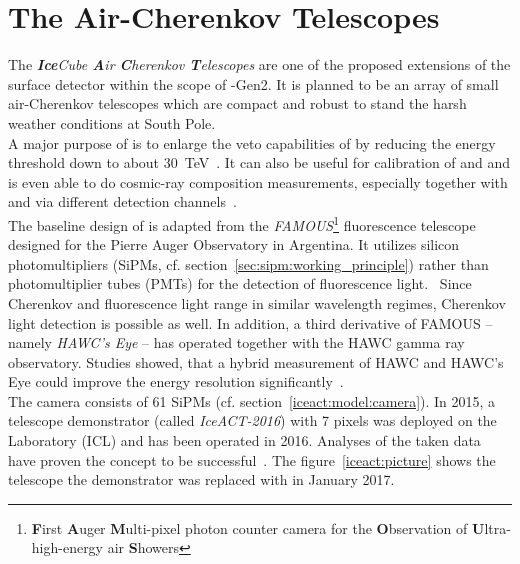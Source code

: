 \section{The \icecube Air-Cherenkov Telescopes \iceact}\label{sec:iceact_intro}

The \textit{\textbf{Ice}Cube \textbf{A}ir \textbf{C}herenkov \textbf{T}elescopes} \textit{\iceact} are one of the proposed extensions of the surface detector \icetop within the scope of \icecube-Gen2. It is planned to be an array of small air-Cherenkov telescopes which are compact and robust to stand the harsh weather conditions at South Pole.\\

A major purpose of \iceact is to enlarge the veto capabilities of \icetop by reducing the energy threshold down to about \SI{30}{\tera\electronvolt}~\cite{icecube:iceact}. It can also be useful for calibration of \icecube and \icetop and is even able to do cosmic-ray composition measurements, especially together with \icecube and \icetop via different detection channels~\cite{iceact:composition}.\\

The baseline design of \iceact is adapted from the \textit{FAMOUS}\footnote{\textbf{F}irst \textbf{A}uger \textbf{M}ulti-pixel photon counter camera for the \textbf{O}bservation of \textbf{U}ltra-high-energy air \textbf{S}howers} fluorescence telescope designed for the Pierre Auger Observatory in Argentina. It utilizes silicon photomultipliers (SiPMs, cf. section~\ref{sec:sipm:working_principle}) rather than photomultiplier tubes (PMTs) for the detection of fluorescence light.~\cite{famous:telescope} Since Cherenkov and fluorescence light range in similar wavelength regimes, Cherenkov light detection is possible as well. In addition, a third derivative of FAMOUS -- namely \textit{HAWC's Eye} -- has operated together with the HAWC gamma ray observatory. Studies showed, that a hybrid measurement of HAWC and HAWC's Eye could improve the energy resolution significantly~\cite{hawcseye:merlin}.\\

The \iceact camera consists of \num{61} SiPMs (cf. section~\ref{iceact:model:camera}). In 2015, a telescope demonstrator (called \textit{IceACT-2016}) with 7 pixels was deployed on the \icecube Laboratory (ICL) and has been operated in 2016. Analyses of the taken data have proven the concept to be successful~\cite{iceact:erik}. The figure~\ref{iceact:picture} shows the telescope the demonstrator was replaced with in January 2017.

